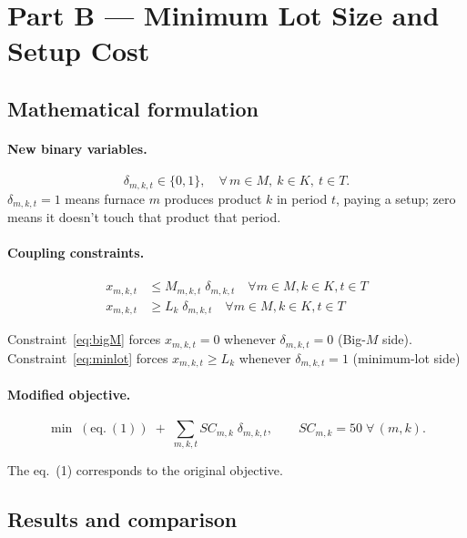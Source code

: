 \documentclass[11pt,a4paper]{article}
\begin{document}
\section{Part B --- Minimum Lot Size and Setup Cost}

\subsection{Mathematical formulation}

\paragraph{New binary variables.}
\[
  \delta_{m,k,t} \in \{0,1\}, \quad \forall\,m\in M,\ k\in K,\ t\in T.
\]
$\delta_{m,k,t}=1$ means furnace $m$ produces product $k$ in period
$t$, paying a setup; zero means it doesn't touch that product that period.

\paragraph{Coupling constraints.}
\begin{align}
  x_{m,k,t} & \leq M_{m,k,t}\;\delta_{m,k,t} \quad \forall m \in M, k \in K, t \in T \tag{B1} \label{eq:bigM} \\[2pt]
  x_{m,k,t} & \geq L_k\;\delta_{m,k,t} \quad \forall m \in M, k \in K, t \in T \tag{B2} \label{eq:minlot}
\end{align}

Constraint~\eqref{eq:bigM} forces $x_{m,k,t}=0$ whenever $\delta_{m,k,t}=0$
(Big-$M$ side).
Constraint~\eqref{eq:minlot} forces $x_{m,k,t} \geq L_k$ whenever
$\delta_{m,k,t}=1$ (minimum-lot side)

\paragraph{Modified objective.}
\[
  \min\;(\text{eq.}\ (1))\;+\;\sum_{m,k,t} SC_{m,k}\;\delta_{m,k,t},
  \qquad SC_{m,k}=50\;\forall\,(m,k).
\]

The eq.~(1) corresponds to the original objective.

\subsection{Results and comparison}
\end{document}
